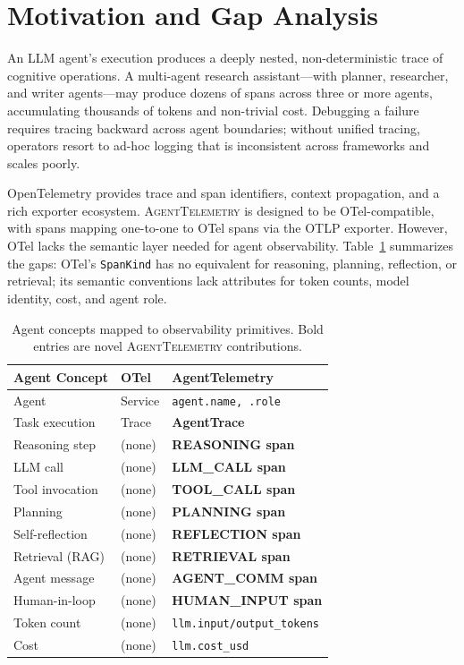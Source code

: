 \documentclass[sigplan,10pt,screen]{acmart}
\begin{document}
\section{Motivation and Gap Analysis}
\label{sec:motivation}

An LLM agent's execution produces a deeply nested, non-deterministic trace
of cognitive operations.  A multi-agent research assistant---with planner,
researcher, and writer agents---may produce dozens of spans across three
or more agents, accumulating thousands of tokens and non-trivial cost.
Debugging a failure requires tracing backward across agent boundaries;
without unified tracing, operators resort to ad-hoc logging that is
inconsistent across frameworks and scales poorly.

OpenTelemetry provides trace and span identifiers, context propagation,
and a rich exporter ecosystem.  \textsc{AgentTelemetry} is designed to
be OTel-compatible, with spans mapping one-to-one to OTel spans via the
OTLP exporter.  However, OTel lacks the semantic layer needed for agent
observability.  Table~\ref{tab:gap} summarizes the gaps: OTel's
\texttt{SpanKind} has no equivalent for reasoning, planning, reflection,
or retrieval; its semantic conventions lack attributes for token counts,
model identity, cost, and agent role.

\begin{table}[t]
\centering
\small
\caption{Agent concepts mapped to observability primitives.  Bold entries
are novel \textsc{AgentTelemetry} contributions.}
\label{tab:gap}
\begin{tabular}{@{}lll@{}}
\toprule
\textbf{Agent Concept} & \textbf{OTel} & \textbf{AgentTelemetry} \\
\midrule
Agent            & Service         & \texttt{agent.name, .role} \\
Task execution   & Trace           & \textbf{AgentTrace} \\
Reasoning step   & (none)          & \textbf{REASONING span} \\
LLM call         & (none)          & \textbf{LLM\_CALL span} \\
Tool invocation  & (none)          & \textbf{TOOL\_CALL span} \\
Planning         & (none)          & \textbf{PLANNING span} \\
Self-reflection  & (none)          & \textbf{REFLECTION span} \\
Retrieval (RAG)  & (none)          & \textbf{RETRIEVAL span} \\
Agent message    & (none)          & \textbf{AGENT\_COMM span} \\
Human-in-loop    & (none)          & \textbf{HUMAN\_INPUT span} \\
Token count      & (none)          & \texttt{llm.input/output\_tokens} \\
Cost             & (none)          & \texttt{llm.cost\_usd} \\
\bottomrule
\end{tabular}
\end{table}
\end{document}

